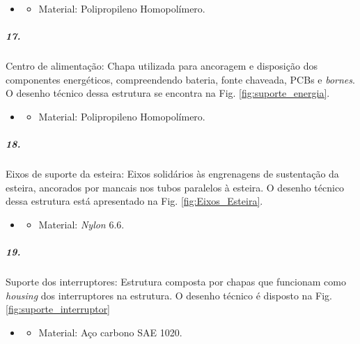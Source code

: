 \begin{itemize}
   \item[]
   \begin{itemize}
       \item Material: Polipropileno Homopolímero.
   \end{itemize}
   \end{itemize} 

 \subparagraph*{17.} \label{retorno_suporte_energia}
 Centro de alimentação: Chapa utilizada para ancoragem e disposição dos componentes energéticos, compreendendo bateria, fonte chaveada, PCBs e \textit{bornes}. O desenho técnico dessa estrutura se encontra na Fig. \ref{fig:suporte_energia}.
 
  \begin{itemize}
   \item[]
   \begin{itemize}
       \item Material: Polipropileno Homopolímero.
   \end{itemize}
   \end{itemize} 
  
 \subparagraph*{18.} \label{retorno_Eixos_Esteira}
 Eixos de suporte da esteira: Eixos solidários às engrenagens de sustentação da esteira, ancorados por mancais nos tubos paralelos à esteira. O desenho técnico dessa estrutura está apresentado na Fig. \ref{fig:Eixos_Esteira}.
 
 \begin{itemize}
   \item[]
   \begin{itemize}
       \item Material: \textit{Nylon} 6.6.
   \end{itemize}
   \end{itemize} 
  
  \subparagraph*{19.} \label{retorno_suporte_interruptor}
  Suporte dos interruptores: Estrutura composta por chapas que funcionam como \textit{housing} dos interruptores na estrutura. O desenho técnico é disposto na Fig. \ref{fig:suporte_interruptor}
  
  \begin{itemize}
   \item[]
   \begin{itemize}
       \item Material: Aço carbono SAE 1020.
   \end{itemize}
   \end{itemize} 
   
